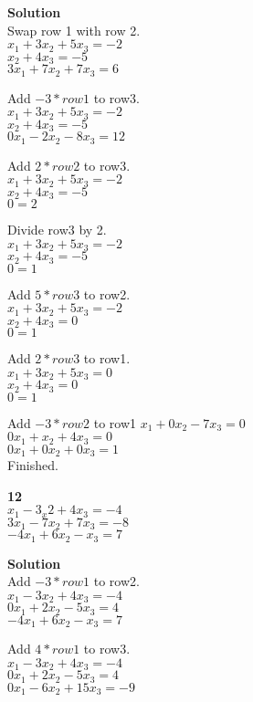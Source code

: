 \documentclass{article}
\begin{document}
\textbf{Solution}\\
Swap row 1 with row 2.\\
$x_{1} + 3x_{2} + 5x_{3} = -2$\\
$x_{2} + 4x_{3} = -5$\\
$3x_{1} + 7x_{2} + 7x_{3} = 6$

Add $-3*row1$ to row3.\\
$x_{1} + 3x_{2} + 5x_{3} = -2$\\
$x_{2} + 4x_{3} = -5$\\
$0x_{1} - 2x_{2} - 8x_{3} = 12$

Add $2*row2$ to row3.\\
$x_{1} + 3x_{2} + 5x_{3} = -2$\\
$x_{2} + 4x_{3} = -5$\\
$0 = 2$

Divide row3 by 2.\\
$x_{1} + 3x_{2} + 5x_{3} = -2$\\
$x_{2} + 4x_{3} = -5$\\
$0 = 1$

Add $5*row3$ to row2.\\
$x_{1} + 3x_{2} + 5x_{3} = -2$\\
$x_{2} + 4x_{3} = 0$\\
$0 = 1$

Add $2*row3$ to row1.\\
$x_{1} + 3x_{2} + 5x_{3} = 0$\\
$x_{2} + 4x_{3} = 0$\\
$0 = 1$

Add $-3*row2$ to row1
$x_{1} + 0x_{2} - 7x_{3} = 0$\\
$0x_{1} + x_{2} + 4x_{3} = 0$\\
$0x_{1} + 0x_{2} + 0x_{3} = 1$
\\Finished.

\textbf{12}\\
$x_{1} - 3_x{2} + 4x_{3} = -4$\\
$3x_{1} - 7x_{2} + 7x_{3} = -8$\\
$-4x_{1} + 6x_{2} - x_{3} = 7$

\textbf{Solution}\\
Add $-3*row1$ to row2.\\
$x_{1} - 3x_{2} + 4x_{3} = -4$\\
$0x_{1} + 2x_{2} - 5x_{3} = 4$\\
$-4x_{1} + 6x_{2} - x_{3} = 7$

Add $4*row1$ to row3.\\
$x_{1} - 3x_{2} + 4x_{3} = -4$\\
$0x_{1} + 2x_{2} - 5x_{3} = 4$\\
$0x_{1} - 6x_{2} + 15x_{3} = -9$
\end{document}
